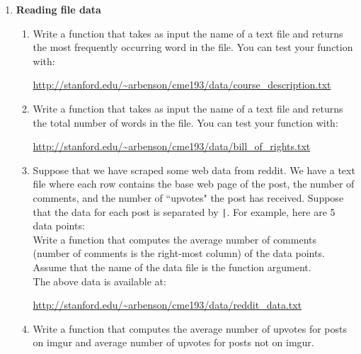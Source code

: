 \documentclass{article}
\newcounter{points}
\begin{document}
\pagestyle{fancy}
\begin{enumerate}

\item \textbf{Reading file data}
\begin{enumerate}
\item Write a function that takes as input the name of a text file and returns the most frequently occurring word in the file.  You can test your function with:
\begin{center}
\url{http://stanford.edu/~arbenson/cme193/data/course_description.txt}
\end{center}
\end{enumerate}

\begin{enumerate}
\setcounter{enumii}{1}
\item Write a function that takes as input the name of a text file and returns the total number of words in the file.  You can test your function with:
\begin{center}
\url{http://stanford.edu/~arbenson/cme193/data/bill_of_rights.txt}
\end{center}
\end{enumerate}

\begin{enumerate}
\setcounter{enumii}{2}
\item Suppose that we have scraped some web data from reddit.  We have a text file where each row contains the base web page of the post, the number of comments, and the number of ``upvotes" the post has received.  Suppose that the data for each post is separated by \texttt{|}.  For example, here are 5 data points: \\

Write a function that computes the average number of comments (number of comments is the right-most column) of the data points.  Assume that the name of the data file is the function argument. \\

The above data is available at:
\begin{center}
\url{http://stanford.edu/~arbenson/cme193/data/reddit_data.txt}
\end{center}
\end{enumerate}

\begin{enumerate}
\setcounter{enumii}{3}
\item Write a function that computes the average number of upvotes for posts on imgur and average number of upvotes for posts not on imgur.
\end{enumerate}


\end{enumerate}
\end{document}
